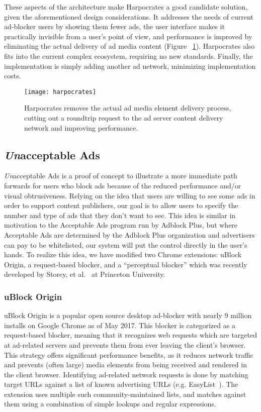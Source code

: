 These aspects of the architecture make Harpocrates a good candidate solution, given the aforementioned design considerations.
It addresses the needs of current ad-blocker users by showing them fewer ads, the user interface makes it practically invisible from a user's point of view, and performance is improved by eliminating the actual delivery of ad media content (Figure ~\ref{fig:harpocrates}).
Harpocrates also fits into the current complex ecosystem, requiring no new standards.
Finally, the implementation is simply adding another ad network, minimizing implementation costs.

\begin{figure}[h]
\centering
\texttt{[image: harpocrates]}
\caption{Harpocrates removes the actual ad media element delivery process, cutting out a roundtrip request to the ad server content delivery network and improving performance.}
\label{fig:harpocrates}
\end{figure}

\subsection{\textit{Un}acceptable Ads}
\textit{Un}acceptable Ads is a proof of concept to illustrate a more immediate path forwards for users who block ads because of the reduced performance and/or visual obtrusiveness.
Relying on the idea that users are willing to see some ads in order to support content publishers, our goal is to allow users to specify the number and type of ads that they don't want to see.
This idea is similar in motivation to the Acceptable Ads program run by Adblock Plus, but where Acceptable Ads are determined by the Adblock Plus organization and advertisers can pay to be whitelisted, our system will put the control directly in the user's hands.
To realize this idea, we have modified two Chrome extensions: uBlock Origin, a request-based blocker, and a ``perceptual blocker'' which was recently developed by Storey, et al.~\cite{storey2016future} at Princeton University.

\subsubsection{uBlock Origin}
uBlock Origin is a popular open source desktop ad-blocker with nearly 9 million installs on Google Chrome as of May 2017.
This blocker is categorized as a request-based blocker, meaning that it recognizes web requests which are targeted at ad-related servers and prevents them from ever leaving the client's browser.
This strategy offers significant performance benefits, as it reduces network traffic and prevents (often large) media elements from being received and rendered in the client browser.
Identifying ad-related network requests is done by matching target URLs against a list of known advertising URLs (e.g. EasyList~\cite{easylist}).
The extension uses multiple such community-maintained lists, and matches against them using a combination of simple lookups and regular expressions.

